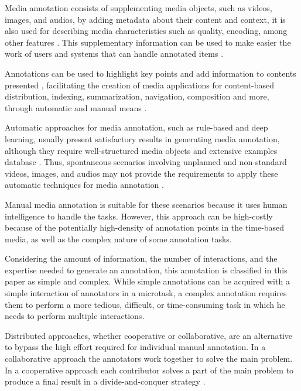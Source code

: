 
Media annotation consists of supplementing media objects, such as videos, images, and audios, by adding metadata about their content and context, it is also used for describing media characteristics such as quality, encoding, among other features \cite{Wang:2009:BDM:1652990.1653002}. This supplementary information can be used to make easier the work of users and systems that can handle annotated items \cite{172450}. 

Annotations can be used to highlight key points and add information to contents presented \cite{Cunha:2015:MVA:2820426.2820449}, facilitating the creation of media applications for content-based distribution, indexing, summarization, navigation, composition and more, through automatic and manual means \cite{Wang:2011:ALM:1899412.1899414,Mihalcea:2007:WLD:1321440.1321475}. 

Automatic approaches for media annotation, such as rule-based and deep learning, usually present satisfactory results in generating media annotation, although they require well-structured media objects and extensive examples database \cite{lecun2015deep}. Thus, spontaneous scenarios involving unplanned and non-standard videos, images, and audios may not provide the requirements to apply these automatic techniques for media annotation \cite{murthy2015automatic}. 

Manual media annotation is suitable for these scenarios because it uses human intelligence to handle the tasks. However, this approach can be high-costly because of the potentially high-density of annotation points in the time-based media, as well as the complex nature of some annotation tasks.

Considering the amount of information, the number of interactions, and the expertise needed to generate an annotation, this annotation is classified in this paper as simple and complex. While simple annotations can be acquired with a simple interaction of annotators in a microtask, a complex annotation requires them to perform a more tedious, difficult, or time-consuming task in which he needs to perform multiple interactions.

Distributed approaches, whether cooperative or collaborative, are an alternative to bypass the high effort required for individual manual annotation. In a collaborative approach the annotators work together to solve the main problem. In a cooperative approach each contributor solves a part of the main problem to produce a final result in a divide-and-conquer strategy  \cite{misanchuk2001building}.

